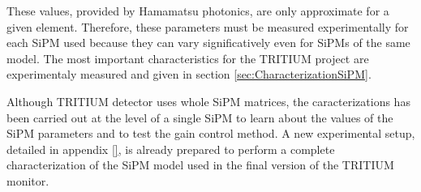 These values, provided by Hamamatsu photonics, are only approximate for a given element. Therefore, these parameters must be measured experimentally for each SiPM used because they can vary significatively even for SiPMs of the same model. The most important characteristics for the TRITIUM project are experimentaly measured and given in section \ref{sec:CharacterizationSiPM}. 

Although TRITIUM detector uses whole SiPM matrices, the caracterizations has been carried out at the level of a single SiPM to learn about the values of the SiPM parameters and to test the gain control method. A new experimental setup, detailed in appendix \ref{}, is already  prepared to perform a complete characterization of the SiPM model used in the final version of the TRITIUM monitor.

 

